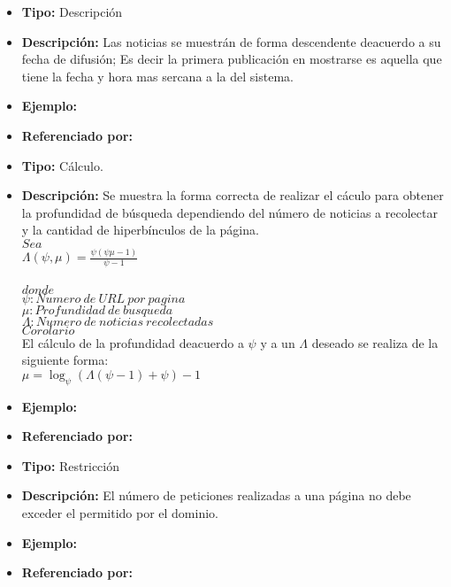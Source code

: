 \begin{itemize}
  \item \textbf{Tipo:} Descripción
  \item \textbf{Descripción:} Las noticias se muestrán de forma descendente deacuerdo a su fecha de difusión; Es decir la primera publicación en mostrarse es aquella que tiene la fecha y hora mas sercana a la del sistema.
  \item \textbf{Ejemplo:} 
  \item \textbf{Referenciado por:}  \\
\end{itemize}


\begin{itemize}
  \item \textbf{Tipo:} Cálculo.
  \item \textbf{Descripción:} Se muestra la forma correcta de realizar el cáculo para obtener la profundidad de búsqueda dependiendo del número de noticias a recolectar y la cantidad de hiperbínculos de la página.\\
 
  $Sea$\\

  $\Lambda(\psi,\mu)=\frac{\psi(\psi\mu-1)}{\psi-1}$\\\\
  $donde$\\
  $\psi:Numero\ de\ URL\ por\ pagina$\\
  $\mu:Profundidad\ de\ busqueda$\\
  $\Lambda:Numero\ de\ noticias\ recolectadas$\\

  $Corolario$\\ 
 El cálculo de la profundidad deacuerdo a $\psi$ y a un $\Lambda$ deseado se realiza de la siguiente forma:\\

  $\mu=\log_{\psi}{(\Lambda(\psi-1)+\psi)}-1$\\

  \item \textbf{Ejemplo:} 
  \item \textbf{Referenciado por:} \\
\end{itemize}


\begin{itemize}
  \item \textbf{Tipo:} Restricción
  \item \textbf{Descripción:} El número de peticiones realizadas a una página no debe exceder el permitido por el dominio.
  \item \textbf{Ejemplo:} 
  \item \textbf{Referenciado por:}  \\
\end{itemize}

